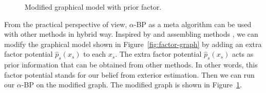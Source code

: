 \begin{figure}[!t]
  \begin{centering}
    \caption{Modified graphical model with prior factor.}\label{fig:factor-graph-with-prior}
  \end{centering}
\end{figure}


From the practical perspective of view, $\alpha$-BP as a meta algorithm can be used with other methods in hybrid way. Inspired by \cite{pseudo_priorBP2010} and assembling methods \cite{James:2014:ISL:2517747}, we can modify the graphical model shown in Figure~\ref{fig:factor-graph} by adding an extra factor potential $\hat{p}_s(x_s)$ to each $x_s$. The extra factor potential $\hat{p}_s(x_s)$ acts as prior information that can be obtained from other methods. In other words, this factor potential stands for our belief from exterior estimation. Then we can run our $\alpha$-BP on the modified graph. The modified graph is shown in Figure~\ref{fig:factor-graph-with-prior}.




